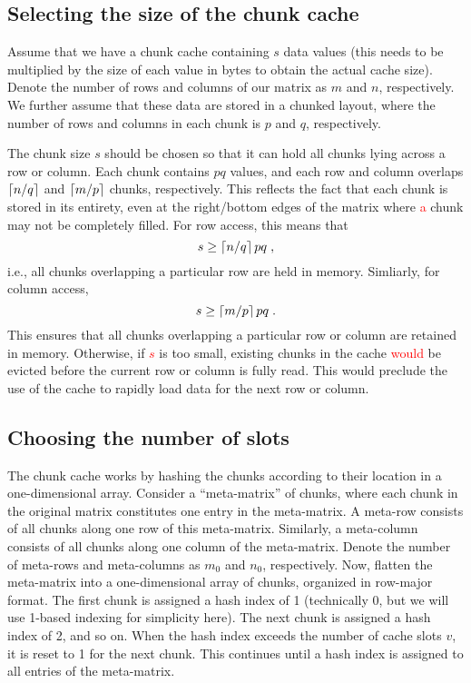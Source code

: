 \documentclass{article}
\newcommand{\revised}[1]{\textcolor{red}{#1}}
\begin{document}
\subsection{Selecting the size of the chunk cache}
Assume that we have a chunk cache containing $s$ data values (this needs to be multiplied by the size of each value in bytes to obtain the actual cache size).
Denote the number of rows and columns of our matrix as $m$ and $n$, respectively. 
We further assume that these data are stored in a chunked layout, where the number of rows and columns in each chunk is $p$ and $q$, respectively.

The chunk size $s$ should be chosen so that it can hold all chunks lying across a row or column.
Each chunk contains $pq$ values, and each row and column overlaps $\left \lceil n/q \right \rceil$ and $\left \lceil m/p \right \rceil$ chunks, respectively.
This reflects the fact that each chunk is stored in its entirety, even at the right/bottom edges of the matrix where \revised{a} chunk may not be completely filled.
For row access, this means that 
\begin{equation}
s \ge \left \lceil n/q \right \rceil pq \;, 
\end{equation}
i.e., all chunks overlapping a particular row are held in memory. Simliarly, for column access, 
\begin{equation}
s \ge \left \lceil m/p \right \rceil pq \;.
\end{equation}
This ensures that all chunks overlapping a particular row or column are retained in memory.
Otherwise, if \revised{$s$} is too small, existing chunks in the cache \revised{would} be evicted before the current row or column is fully read.
This would preclude the use of the cache to rapidly load data for the next row or column.


\subsection{Choosing the number of slots}
\label{sec:slotchoice}
The chunk cache works by hashing the chunks according to their location in a one-dimensional array.
Consider a ``meta-matrix'' of chunks, where each chunk in the original matrix constitutes one entry in the meta-matrix.
A meta-row consists of all chunks along one row of this meta-matrix.
Similarly, a meta-column consists of all chunks along one column of the meta-matrix. 
Denote the number of meta-rows and meta-columns as $m_0$ and $n_0$, respectively.
Now, flatten the meta-matrix into a one-dimensional array of chunks, organized in row-major format.
The first chunk is assigned a hash index of 1 (technically 0, but we will use 1-based indexing for simplicity here).
The next chunk is assigned a hash index of 2, and so on.
When the hash index exceeds the number of cache slots $v$, it is reset to 1 for the next chunk.
This continues until a hash index is assigned to all entries of the meta-matrix.
\end{document}
